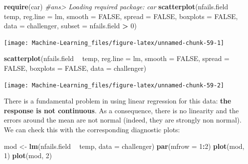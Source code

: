 \documentclass[]{book}
\newenvironment{Shaded}{\begin{snugshade}}{\end{snugshade}}
\newcommand{\KeywordTok}[1]{\textcolor[rgb]{0.13,0.29,0.53}{\textbf{#1}}}
\newcommand{\DataTypeTok}[1]{\textcolor[rgb]{0.13,0.29,0.53}{#1}}
\newcommand{\DecValTok}[1]{\textcolor[rgb]{0.00,0.00,0.81}{#1}}
\newcommand{\StringTok}[1]{\textcolor[rgb]{0.31,0.60,0.02}{#1}}
\newcommand{\CommentTok}[1]{\textcolor[rgb]{0.56,0.35,0.01}{\textit{#1}}}
\newcommand{\OtherTok}[1]{\textcolor[rgb]{0.56,0.35,0.01}{#1}}
\newcommand{\OperatorTok}[1]{\textcolor[rgb]{0.81,0.36,0.00}{\textbf{#1}}}
\newcommand{\NormalTok}[1]{#1}
\theoremstyle{definition}
\theoremstyle{definition}
\theoremstyle{definition}
\theoremstyle{remark}
\begin{document}
\begin{Shaded}
\begin{Highlighting}[]
\KeywordTok{require}\NormalTok{(car)}
\CommentTok{#ans> Loading required package: car}
\KeywordTok{scatterplot}\NormalTok{(nfails.field }\OperatorTok{~}\StringTok{ }\NormalTok{temp, }\DataTypeTok{reg.line =}\NormalTok{ lm, }\DataTypeTok{smooth =} \OtherTok{FALSE}\NormalTok{, }\DataTypeTok{spread =} \OtherTok{FALSE}\NormalTok{,}
            \DataTypeTok{boxplots =} \OtherTok{FALSE}\NormalTok{, }\DataTypeTok{data =}\NormalTok{ challenger, }\DataTypeTok{subset =}\NormalTok{ nfails.field }\OperatorTok{>}\StringTok{ }\DecValTok{0}\NormalTok{)}
\end{Highlighting}
\end{Shaded}

\begin{center}\texttt{[image: Machine-Learning\_files/figure-latex/unnamed-chunk-59-1]} \end{center}

\begin{Shaded}
\begin{Highlighting}[]
\KeywordTok{scatterplot}\NormalTok{(nfails.field }\OperatorTok{~}\StringTok{ }\NormalTok{temp, }\DataTypeTok{reg.line =}\NormalTok{ lm, }\DataTypeTok{smooth =} \OtherTok{FALSE}\NormalTok{, }\DataTypeTok{spread =} \OtherTok{FALSE}\NormalTok{,}
            \DataTypeTok{boxplots =} \OtherTok{FALSE}\NormalTok{, }\DataTypeTok{data =}\NormalTok{ challenger)}
\end{Highlighting}
\end{Shaded}

\begin{center}\texttt{[image: Machine-Learning\_files/figure-latex/unnamed-chunk-59-2]} \end{center}

There is a fundamental problem in using linear regression for this data:
\textbf{the response is not continuous}. As a consequence, there is no
linearity and the errors around the mean are not normal (indeed, they
are strongly non normal). We can check this with the corresponding
diagnostic plots:

\begin{Shaded}
\begin{Highlighting}[]
\NormalTok{mod <-}\StringTok{ }\KeywordTok{lm}\NormalTok{(nfails.field }\OperatorTok{~}\StringTok{ }\NormalTok{temp, }\DataTypeTok{data =}\NormalTok{ challenger)}
\KeywordTok{par}\NormalTok{(}\DataTypeTok{mfrow =} \DecValTok{1}\OperatorTok{:}\DecValTok{2}\NormalTok{)}
\KeywordTok{plot}\NormalTok{(mod, }\DecValTok{1}\NormalTok{)}
\KeywordTok{plot}\NormalTok{(mod, }\DecValTok{2}\NormalTok{)}
\end{Highlighting}
\end{Shaded}
\end{document}
